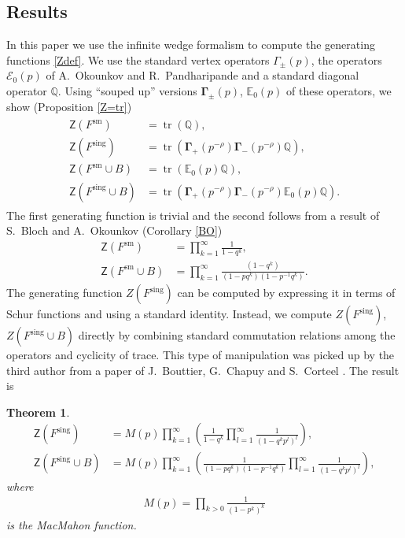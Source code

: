 \documentclass{amsart}
\newtheorem{theorem}{Theorem}%
\theoremstyle{definition}
\newcommand{\QQ} {\mathbb{Q}}		%
\newcommand{\bfGamma} {\mathbf{\Gamma}}
\newcommand{\sm}{\mathrm{sm}}
\newcommand{\sing}{\mathrm{sing}}
\newcommand{\E}{\mathcal{E}}
\newcommand{\EE}{\mathbb{E}}
\newcommand{\sfZ} {\mathsf{Z}}
\newcommand{\tr}{\operatorname{tr}}
\begin{document}
\subsection{Results} In this paper we use the infinite wedge formalism to compute the generating functions \eqref{Zdef}. We use the standard vertex operators $\Gamma_{\pm}(p)$, the operators $\E_0(p)$ of A.~Okounkov and R.~Pandharipande \cite{OP} and a standard diagonal operator $\QQ$. Using ``souped up'' versions $\bfGamma_{\pm}(p)$, $\EE_0(p)$ of these operators, we show (Proposition \ref{Z=tr})
\begin{align} \label{Z}
\begin{split}
\sfZ(F^{\sm}) &= \tr(\QQ), \\
\sfZ(F^{\sing}) &= \tr(\bfGamma_+(p^{-\rho}) \bfGamma_-(p^{-\rho}) \QQ), \\
\sfZ(F^{\sm} \cup B) &= \tr(\EE_0(p) \QQ), \\
\sfZ(F^{\sing} \cup B) &= \tr(\bfGamma_+(p^{-\rho}) \bfGamma_-(p^{-\rho}) \EE_0(p) \QQ). 
\end{split}
\end{align}
The first generating function is trivial and the second follows from a result of S.~Bloch and A.~Okounkov \cite{BO} (Corollary \ref{BO})
\begin{align*} 
\sfZ(F^{\sm}) &= \prod_{k=1}^{\infty} \frac{1}{1-q^k}, \\
\sfZ(F^{\sm} \cup B) &= \prod_{k=1}^{\infty} \frac{(1-q^k)}{(1-p q^k)(1-p^{-1} q^k)}.
\end{align*}
The generating function $Z(F^{\sing})$ can be computed by expressing it in terms of Schur functions and using a standard identity. Instead, we compute $Z(F^{\sing})$, $Z(F^{\sing} \cup B)$ directly by combining standard commutation relations among the operators and cyclicity of trace. This type of manipulation was picked up by the third author from a paper of J.~Bouttier, G.~Chapuy and S.~Corteel \cite{BCC}. The result is 
\begin{theorem} \label{main}
\begin{align*} 
\sfZ(F^{\sing}) &= M(p) \prod_{k=1}^{\infty} \left( \frac{1}{1-q^k} \prod_{l=1}^{\infty} \frac{1}{(1-q^{k} p^l)^l} \right), \\
\sfZ(F^{\sing} \cup B) &= M(p) \prod_{k=1}^{\infty} \left( \frac{1}{(1-p q^k)(1-p^{-1} q^k)} \prod_{l=1}^{\infty} \frac{1}{(1-q^k p^l)^l} \right), 
\end{align*}
where 
\begin{align*}
M(p) = \prod_{k>0} \frac{1}{(1-p^k)^k}
\end{align*}
is the MacMahon function.
\end{theorem}
\end{document}
